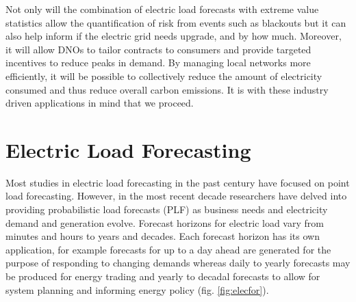 Not only will the combination of electric load forecasts with extreme value statistics allow the quantification of risk from events such as blackouts but it can also help inform if the electric grid needs upgrade, and by how much. Moreover, it will allow DNOs to tailor contracts to consumers and provide targeted incentives to reduce peaks in demand. By managing local networks more efficiently, it will be possible to collectively reduce the amount of electricity consumed and thus reduce overall carbon emissions. It is with these industry driven applications in mind that we proceed.





\section{Electric Load Forecasting} \label{subsec:litrev}

Most studies in electric load forecasting in the past century have focused on point load forecasting. However, in the most recent decade researchers have delved into providing probabilistic load forecasts (PLF) as business needs and electricity demand and generation evolve. Forecast horizons for electric load vary from minutes and hours to years and decades. Each forecast horizon has its own application, for example forecasts for up to a day ahead are generated for the purpose of responding to changing demands whereas daily to yearly forecasts may be produced for energy trading and yearly to decadal forecasts to allow for system planning and informing energy policy (fig. \ref{fig:elecfor}).

